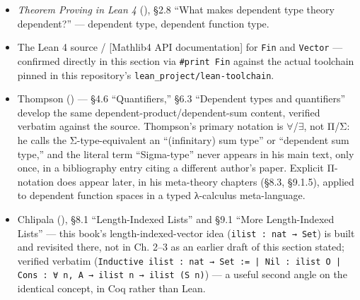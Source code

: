 \begin{itemize}
\tightlist
\item
  \emph{Theorem Proving in Lean 4} (\cite{TPIL4}), §2.8 ``What makes dependent type theory dependent?'' --- dependent type, dependent function type.
\item
  The Lean 4 source / {[}Mathlib4 API documentation{]}\cite{Mathlib4Docs} for \texttt{Fin} and \texttt{Vector} --- confirmed directly in this section via \texttt{\#print Fin} against the actual toolchain pinned in this repository's \texttt{lean\_\allowbreak{}project/\allowbreak{}lean-\allowbreak{}toolchain}.
\item
  Thompson (\cite{Thompson1991}) --- §4.6 ``Quantifiers,'' §6.3 ``Dependent types and quantifiers'' develop the same dependent-product/dependent-sum content, verified verbatim against the source. Thompson's primary notation is \(\forall\)/\(\exists\), not Π/Σ: he calls the Σ-type-equivalent an ``(infinitary) sum type'' or ``dependent sum type,'' and the literal term ``Sigma-type'' never appears in his main text, only once, in a bibliography entry citing a different author's paper. Explicit Π-notation does appear later, in his meta-theory chapters (§8.3, §9.1.5), applied to dependent function spaces in a typed λ-calculus meta-language.
\item
  Chlipala (\cite{Chlipala2013}), §8.1 ``Length-Indexed Lists'' and §9.1 ``More Length-Indexed Lists'' --- this book's length-indexed-vector idea (\texttt{ilist : nat → Set}) is built and revisited there, not in Ch. 2--3 as an earlier draft of this section stated; verified verbatim (\texttt{Inductive ilist : nat → Set := | Nil : ilist O | Cons : ∀ n, A → ilist n → ilist (S n)}) --- a useful second angle on the identical concept, in Coq rather than Lean.
\end{itemize}
